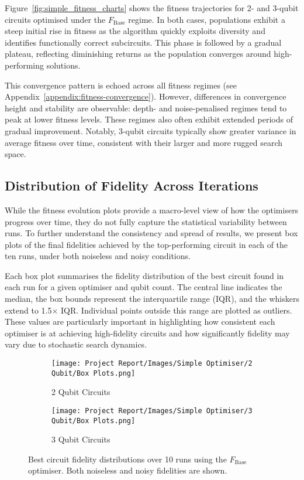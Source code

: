 \documentclass[11pt,a4paper]{article}
\begin{document}
Figure~\ref{fig:simple_fitness_charts} shows the fitness trajectories for 2- and 3-qubit circuits optimised under the $F_{\mathrm{Base}}$ regime. In both cases, populations exhibit a steep initial rise in fitness as the algorithm quickly exploits diversity and identifies functionally correct subcircuits. This phase is followed by a gradual plateau, reflecting diminishing returns as the population converges around high-performing solutions.\newline

This convergence pattern is echoed across all fitness regimes (see Appendix~\ref{appendix:fitness-convergence}). However, differences in convergence height and stability are observable: depth- and noise-penalised regimes tend to peak at lower fitness levels. These regimes also often exhibit extended periods of gradual improvement. Notably, 3-qubit circuits typically show greater variance in average fitness over time, consistent with their larger and more rugged search space.

\subsection{Distribution of Fidelity Across Iterations}\label{sec:box_plots}
While the fitness evolution plots provide a macro-level view of how the optimisers progress over time, they do not fully capture the statistical variability between runs. To further understand the consistency and spread of results, we present box plots of the final fidelities achieved by the top-performing circuit in each of the ten runs, under both noiseless and noisy conditions.\newline

Each box plot summarises the fidelity distribution of the best circuit found in each run for a given optimiser and qubit count. The central line indicates the median, the box bounds represent the interquartile range (IQR), and the whiskers extend to 1.5× IQR. Individual points outside this range are plotted as outliers. These values are particularly important in highlighting how consistent each optimiser is at achieving high-fidelity circuits and how significantly fidelity may vary due to stochastic search dynamics.

\begin{figure}[H]
\centering
\begin{subfigure}{.5\textwidth}
  \centering
  \texttt{[image: Project Report/Images/Simple Optimiser/2 Qubit/Box Plots.png]}
  \caption{2 Qubit Circuits}
  \label{fig:simple_box_2q}
\end{subfigure}%
\begin{subfigure}{.5\textwidth}
  \centering
  \texttt{[image: Project Report/Images/Simple Optimiser/3 Qubit/Box Plots.png]}
  \caption{3 Qubit Circuits}
  \label{fig:simple_box_3q}
\end{subfigure}
\caption{Best circuit fidelity distributions over 10 runs using the $F_{\mathrm{Base}}$ optimiser. Both noiseless and noisy fidelities are shown.}
\label{fig:simple_box_plots}
\end{figure}
\end{document}
